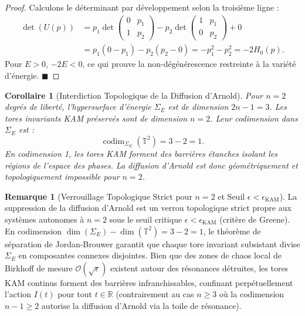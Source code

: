 \documentclass[10pt,twocolumn,a4paper]{article}
\theoremstyle{plain}
\newtheorem{corollary}[theorem]{Corollaire}
\theoremstyle{definition}
\newtheorem{remark}[theorem]{Remarque}
\begin{document}
\begin{proof}
Calculons le déterminant par développement selon la troisième ligne :
\begin{align*}
\det(U(p)) &= p_1 \det\begin{pmatrix} 0 & p_1 \\ 1 & p_2 \end{pmatrix} - p_2 \det\begin{pmatrix} 1 & p_1 \\ 0 & p_2 \end{pmatrix} + 0 \\
&= p_1(0 - p_1) - p_2(p_2 - 0) = -p_1^2 - p_2^2 = -2H_0(p).
\end{align*}
Pour $E > 0$, $-2E < 0$, ce qui prouve la non-dégénérescence restreinte à la variété d'énergie. $\blacksquare$
\end{proof}

\begin{corollary}[Interdiction Topologique de la Diffusion d'Arnold]
Pour $n = 2$ degrés de liberté, l'hypersurface d'énergie $\Sigma_E$ est de dimension $2n - 1 = 3$. Les tores invariants KAM préservés sont de dimension $n = 2$. Leur codimension dans $\Sigma_E$ est :
\begin{equation}
\operatorname{codim}_{\Sigma_E}(\mathbb{T}^2) = 3 - 2 = 1.
\label{eq:codimension_1}
\end{equation}
En codimension 1, les tores KAM forment des barrières étanches isolant les régions de l'espace des phases. La diffusion d'Arnold est donc géométriquement et topologiquement impossible pour $n = 2$.
\end{corollary}

\begin{remark}[Verrouillage Topologique Strict pour $n = 2$ et Seuil $\epsilon < \epsilon_{\text{KAM}}$]
La suppression de la diffusion d'Arnold est un verrou topologique strict propre aux systèmes autonomes à $n = 2$ sous le seuil critique $\epsilon < \epsilon_{\text{KAM}}$ (critère de Greene). En codimension $\dim(\Sigma_E) - \dim(\mathbb{T}^2) = 3 - 2 = 1$, le théorème de séparation de Jordan-Brouwer garantit que chaque tore invariant subsistant divise $\Sigma_E$ en composantes connexes disjointes. Bien que des zones de chaos local de Birkhoff de mesure $\mathcal{O}(\sqrt{\epsilon})$ existent autour des résonances détruites, les tores KAM continus forment des barrières infranchissables, confinant perpétuellement l'action $I(t)$ pour tout $t \in \mathbb{R}$ (contrairement au cas $n \ge 3$ où la codimension $n - 1 \ge 2$ autorise la diffusion d'Arnold via la toile de résonance).
\end{remark}
\end{document}
